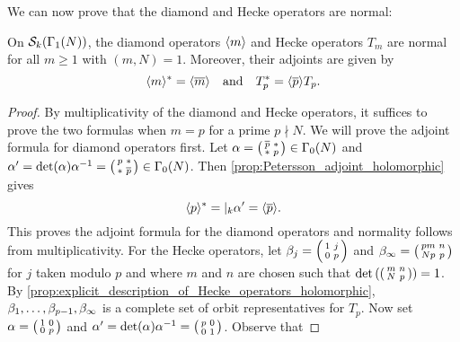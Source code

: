     We can now prove that the diamond and Hecke operators are normal:

    \begin{proposition}\label{prop:Hecke_operators_normal_holomorphic}
      On $\mathcal{S}_{k}(\Gamma_{1}(N))$, the diamond operators $\langle m\rangle$ and Hecke operators $T_{m}$ are normal for all $m \ge 1$ with $(m,N) = 1$. Moreover, their adjoints are given by
      \[
        \langle m\rangle^{\ast} = \langle\overline{m}\rangle \quad \text{and} \quad T_{p}^{\ast} = \langle\overline{p}\rangle T_{p}.
      \]
    \end{proposition}
    \begin{proof}
      By multiplicativity of the diamond and Hecke operators, it suffices to prove the two formulas when $m = p$ for a prime $p \nmid N$. We will prove the adjoint formula for diamond operators first. Let $\alpha = \begin{psmallmatrix} \overline{p} & \ast \\ \ast & p \end{psmallmatrix} \in \Gamma_{0}(N)$ and $\alpha' = \det(\alpha)\alpha^{-1} = \begin{psmallmatrix} p & \ast \\ \ast & \overline{p} \end{psmallmatrix} \in \Gamma_{0}(N)$. Then \cref{prop:Petersson_adjoint_holomorphic} gives
      \[
        \langle p\rangle^{\ast} = |_{k}\alpha' = \langle\overline{p}\rangle.
      \]
      This proves the adjoint formula for the diamond operators and normality follows from multiplicativity. For the Hecke operators, let $\beta_{j} = \begin{psmallmatrix} 1 & j \\ 0 & p \end{psmallmatrix}$ and $\beta_{\infty} = \begin{psmallmatrix} pm & n \\ Np & p \end{psmallmatrix}$ for $j$ taken modulo $p$ and where $m$ and $n$ are chosen such that $\det\left(\begin{psmallmatrix} m & n \\ N & p \end{psmallmatrix}\right) = 1$. By \cref{prop:explicit_description_of_Hecke_operators_holomorphic}, $\beta_{1},\ldots,\beta_{p-1},\beta_{\infty}$ is a complete set of orbit representatives for $T_{p}$. Now set $\alpha = \begin{psmallmatrix} 1 & 0 \\ 0 & p \end{psmallmatrix}$ and $\alpha' = \det(\alpha)\alpha^{-1} = \begin{psmallmatrix} p & 0 \\ 0 & 1 \end{psmallmatrix}$. Observe that

\end{proof}
